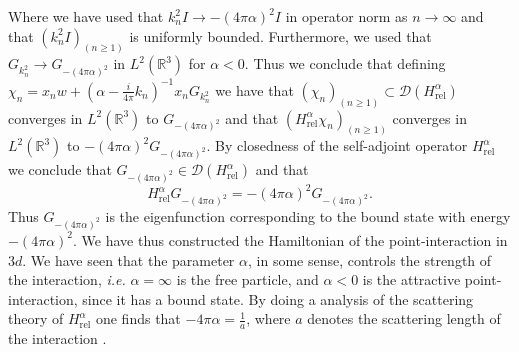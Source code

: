 \documentclass[a4paper,11pt]{article}
\newcommand{\dom}[1]{\mathscr D\left(#1\right)}
\newcommand{\ie}{\emph{i.e.} }
\newcommand{\R}{\mathbb{R}}
\numberwithin{equation}{section}
\begin{document}
Where we have used that $ k_n^2I\to-(4\pi\alpha)^2I $ in operator norm as $ n\to \infty $ and that $ (k_n^2I)_{(n\geq1)} $ is uniformly bounded. Furthermore, we used that $ G_{k_n^2}\to G_{-(4\pi\alpha)^2} $ in $ L^2(\R^3) $ for $ \alpha<0 $. Thus we conclude that defining $ \chi_n=x_nw+(\alpha-\frac{i}{4\pi}k_n)^{-1}x_nG_{k_n^2} $ we have that $ \left(\chi_n\right)_{(n\geq1)}\subset\dom{H_{\text{rel}}^\alpha} $ converges in $ L^2(\R^3) $ to $ G_{-(4\pi\alpha)^2} $ and that $ \left(H_{\text{rel}}^\alpha\chi_n\right)_{(n\geq1)} $ converges in $ L^2(\R^3) $ to $ -(4\pi\alpha)^2G_{-(4\pi\alpha)^2} $. By closedness of the self-adjoint operator $ H_{\text{rel}}^\alpha $ we conclude that $ G_{-(4\pi\alpha)^2}\in\dom{H_{\text{rel}}^\alpha} $ and that\begin{equation}
H_{\text{rel}}^\alpha G_{-(4\pi\alpha)^2}=-(4\pi\alpha)^2G_{-(4\pi\alpha)^2}.
\end{equation}
Thus $ G_{-(4\pi\alpha)^2} $ is the eigenfunction corresponding to the bound state with energy $ -(4\pi\alpha)^2 $. We have thus constructed the Hamiltonian of the point-interaction in $ 3d $. We have seen that the parameter $ \alpha $, in some sense, controls the strength of the interaction, \ie $ \alpha=\infty $ is the free particle, and $ \alpha<0 $ is the attractive point-interaction, since it has a bound state. By doing a analysis of the scattering theory of $ H_{\text{rel}}^\alpha $ one finds that $ -4\pi\alpha=\frac{1}{a} $, where $ a $ denotes the scattering length of the interaction \cite{albeverio2012solvable}. 
\end{document}
